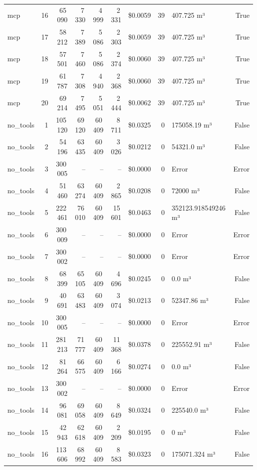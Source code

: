 \documentclass[a4paper,11pt]{article}
\begin{document}
\begin{table}[H]
{\begin{tabular}{l r r r r r r r l r}
mcp & 16 & 65\,090 & 7\,330 & 4\,999 & 2\,331 & \$0.0059 & 39 & 407.725 m³ & True \\
mcp & 17 & 58\,212 & 7\,389 & 5\,086 & 2\,303 & \$0.0059 & 39 & 407.725 m³ & True \\
mcp & 18 & 57\,501 & 7\,460 & 5\,086 & 2\,374 & \$0.0060 & 39 & 407.725 m³ & True \\
mcp & 19 & 61\,787 & 7\,308 & 4\,940 & 2\,368 & \$0.0060 & 39 & 407.725 m³ & True \\
mcp & 20 & 69\,214 & 7\,495 & 5\,051 & 2\,444 & \$0.0062 & 39 & 407.725 m³ & True \\
\midrule
no\_tools & 1 & 105\,120 & 69\,120 & 60\,409 & 8\,711 & \$0.0325 & 0 & 175058.19 m³ & False \\
no\_tools & 2 & 54\,196 & 63\,435 & 60\,409 & 3\,026 & \$0.0212 & 0 & 54321.0 m³ & False \\
no\_tools & 3 & 300\,005 & -- & -- & -- & \$0.0000 & 0 & Error & Error \\
no\_tools & 4 & 51\,460 & 63\,274 & 60\,409 & 2\,865 & \$0.0208 & 0 & 72000 m³ & False \\
no\_tools & 5 & 222\,461 & 76\,010 & 60\,409 & 15\,601 & \$0.0463 & 0 & 352123.918549246 m³ & False \\
no\_tools & 6 & 300\,009 & -- & -- & -- & \$0.0000 & 0 & Error & Error \\
no\_tools & 7 & 300\,002 & -- & -- & -- & \$0.0000 & 0 & Error & Error \\
no\_tools & 8 & 68\,399 & 65\,105 & 60\,409 & 4\,696 & \$0.0245 & 0 & 0.0 m³ & False \\
no\_tools & 9 & 40\,691 & 63\,483 & 60\,409 & 3\,074 & \$0.0213 & 0 & 52347.86 m³ & False \\
no\_tools & 10 & 300\,005 & -- & -- & -- & \$0.0000 & 0 & Error & Error \\
no\_tools & 11 & 281\,213 & 71\,777 & 60\,409 & 11\,368 & \$0.0378 & 0 & 225552.91 m³ & False \\
no\_tools & 12 & 81\,264 & 66\,575 & 60\,409 & 6\,166 & \$0.0274 & 0 & 0.0 m³ & False \\
no\_tools & 13 & 300\,002 & -- & -- & -- & \$0.0000 & 0 & Error & Error \\
no\_tools & 14 & 96\,081 & 69\,058 & 60\,409 & 8\,649 & \$0.0324 & 0 & 225540.0 m³ & False \\
no\_tools & 15 & 42\,943 & 62\,618 & 60\,409 & 2\,209 & \$0.0195 & 0 & 0 m³ & False \\
no\_tools & 16 & 113\,606 & 68\,992 & 60\,409 & 8\,583 & \$0.0323 & 0 & 175071.324 m³ & False \\

\end{tabular}}
\end{table}
\end{document}
